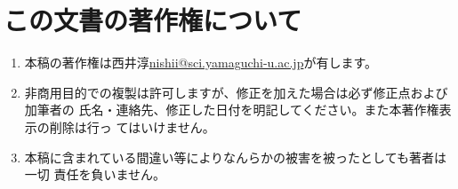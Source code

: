 \documentclass[12pt]{jarticle}
\begin{document}
\section{この文書の著作権について}

\begin{enumerate}
\item 本稿の著作権は西井淳\url{nishii@sci.yamaguchi-u.ac.jp}が有します。
\item 非商用目的での複製は許可しますが、修正を加えた場合は必ず修正点および加筆者の
氏名・連絡先、修正した日付を明記してください。また本著作権表示の削除は行っ
てはいけません。
\item 本稿に含まれている間違い等によりなんらかの被害を被ったとしても著者は一切
責任を負いません。
\end{enumerate}
\end{document}
